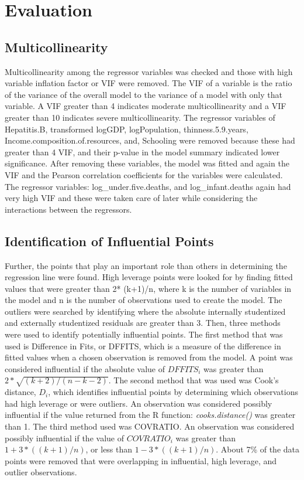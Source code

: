 \section{Evaluation}
\label{sec:evaluation}

\subsection{Multicollinearity}
\label{sec:multicollinearity}
Multicollinearity among the regressor variables was checked and those with high variable inflation factor or VIF were removed. The VIF of a variable is the ratio of the variance of the overall model to the variance of a model with only that variable. A VIF greater than 4 indicates moderate multicollinearity and a VIF greater than 10 indicates severe multicollinearity. The regressor variables of Hepatitis.B, transformed logGDP, logPopulation, thinness.5.9.years, Income.composition.of.resources, and, Schooling were removed because these had greater than 4 VIF, and their p-value in the model summary indicated lower significance. 
After removing these variables, the model was fitted and again the VIF and the Pearson correlation coefficients for the variables were calculated. The regressor variables: log_under.five.deaths, and log_infant.deaths again had very high VIF and these were taken care of later while considering the interactions between the regressors.

\subsection{Identification of Influential Points}
\label{sec:influential-points}
Further, the points that play an important role than others in determining the regression line were found. High leverage points were looked for by finding fitted values that were greater than 2* (k+1)/n, where k is the number of variables in the model and n is the number of observations used to create the model. The outliers were searched by identifying where the absolute internally studentized and externally studentized residuals are greater than 3. Then, three methods were used to identify potentially influential points. The first method that was used is Difference in Fits, or DFFITS, which is a measure of the difference in fitted values when a chosen observation is removed from the model. A point was considered influential if the absolute value of $DFFITS_i$ was greater than $2* \sqrt{(k+2)/(n-k-2)}$. The second method that was used was Cook’s distance, $D_i$, which identifies influential points by determining which observations had high leverage or were outliers. An observation was considered possibly influential if the value returned from the R function: \textit{cooks.distance()} was greater than 1. The third method used was COVRATIO. An observation was considered possibly influential if the value of $COVRATIO_i$ was greater than $1+ 3*((k+1)/n)$, or less than $1- 3*((k+1)/n)$.
About 7\% of the data points were removed that were overlapping in influential, high leverage, and outlier observations.

